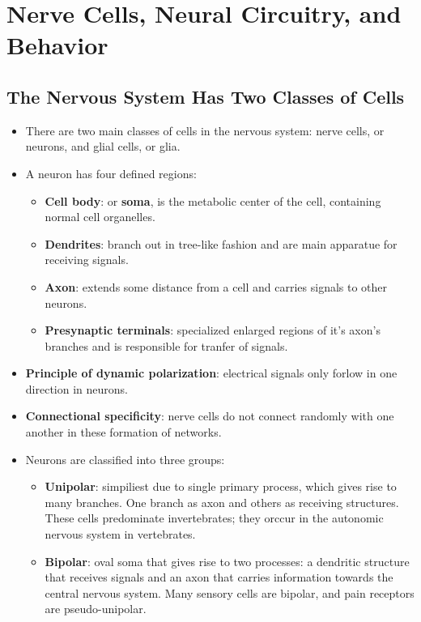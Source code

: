 \documentclass[12pt,a4paper]{article}
\begin{document}
\clearpage
\section{Nerve Cells, Neural Circuitry, and Behavior}
\subsection{The Nervous System Has Two Classes of Cells}
\begin{itemize}
\item There are two main classes of cells in the nervous system: nerve cells, or neurons, and glial cells, or glia.
    \item A neuron has four defined regions:
        \begin{itemize}
            \item \textbf{Cell body}: or \textbf{soma}, is the metabolic center of the cell, containing normal cell organelles.
            \item \textbf{Dendrites}: branch out in tree-like fashion and are main apparatue for receiving signals.
            \item \textbf{Axon}: extends some distance from a cell and carries signals to other neurons.
            \item \textbf{Presynaptic terminals}: specialized enlarged regions of it's axon's branches and is responsible for tranfer of signals.
        \end{itemize}
    \item \textbf{Principle of dynamic polarization}: electrical signals only forlow in one direction in neurons.
    \item \textbf{Connectional specificity}: nerve cells do not connect randomly with one another in these formation of networks.
    \item Neurons are classified into three groups:
        \begin{itemize}
            \item \textbf{Unipolar}: simpiliest due to single primary process, which gives rise to many branches. One branch as axon and others as receiving structures. These cells predominate invertebrates; they orccur in the autonomic nervous system in vertebrates. 
            \item \textbf{Bipolar}: oval soma that gives rise to two processes: a dendritic structure that receives signals and an axon that carries information towards the central nervous system. Many sensory cells are bipolar, and pain receptors are pseudo-unipolar. 

\end{itemize}
\end{itemize}
\end{document}
